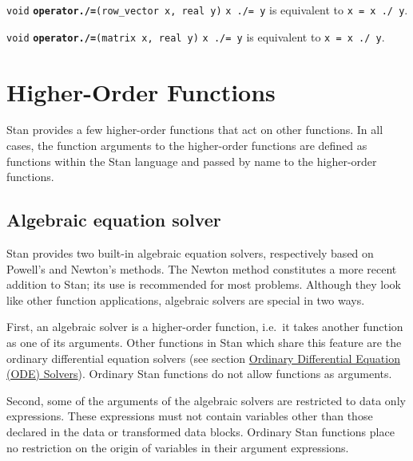 \documentclass[
  10pt,
]{book}
\begin{document}
\texttt{void} \textbf{\texttt{operator./=}}\texttt{(row\_vector\ x,\ real\ y)}\newline
\texttt{x\ ./=\ y} is equivalent to \texttt{x\ =\ x\ ./\ y}.


\texttt{void} \textbf{\texttt{operator./=}}\texttt{(matrix\ x,\ real\ y)}\newline
\texttt{x\ ./=\ y} is equivalent to \texttt{x\ =\ x\ ./\ y}.

\hypertarget{higher-order-functions}{%
\chapter{Higher-Order Functions}\label{higher-order-functions}}

Stan provides a few higher-order functions that act on other
functions. In all cases, the function arguments to the higher-order
functions are defined as functions within the Stan language and passed
by name to the higher-order functions.

\hypertarget{functions-algebraic-solver}{%
\section{Algebraic equation solver}\label{functions-algebraic-solver}}

Stan provides two built-in algebraic equation solvers,
respectively based on Powell's and Newton's methods.
The Newton method constitutes a more recent addition to Stan;
its use is recommended for most problems.
Although they look like other function applications,
algebraic solvers are special in two ways.

First, an algebraic solver is a higher-order function, i.e.~it takes
another function as one of its arguments. Other functions in
Stan which share this feature are the ordinary differential equation
solvers (see section \protect\hyperlink{functions-ode-solver}{Ordinary Differential Equation (ODE) Solvers}).
Ordinary Stan functions do not allow functions as arguments.

Second, some of the arguments of the algebraic solvers are restricted
to data only expressions. These expressions must not contain variables
other than those declared in the data or transformed data blocks.
Ordinary Stan functions place no restriction on the origin of
variables in their argument expressions.
\end{document}
